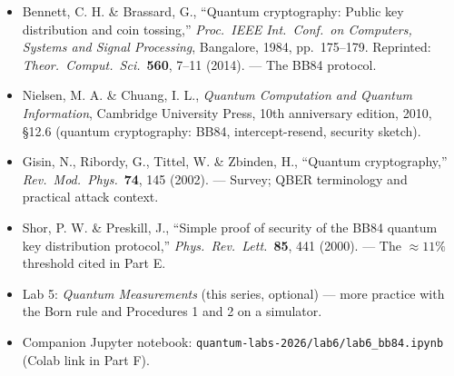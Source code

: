 \documentclass[a4paper,11pt]{article}
\begin{document}
\begin{itemize}
    \item Bennett, C. H. \& Brassard, G., ``Quantum cryptography: Public key
          distribution and coin tossing,'' \textit{Proc.\ IEEE Int.\ Conf.\ on
          Computers, Systems and Signal Processing}, Bangalore, 1984, pp.~175--179.
          Reprinted: \textit{Theor.\ Comput.\ Sci.}\ \textbf{560}, 7--11 (2014).
          --- The BB84 protocol.
    \item Nielsen, M. A. \& Chuang, I. L., \textit{Quantum Computation and Quantum
          Information}, Cambridge University Press, 10th anniversary edition, 2010,
          \S 12.6 (quantum cryptography: BB84, intercept-resend, security sketch).
    \item Gisin, N., Ribordy, G., Tittel, W. \& Zbinden, H., ``Quantum
          cryptography,'' \textit{Rev.\ Mod.\ Phys.}\ \textbf{74}, 145 (2002). ---
          Survey; QBER terminology and practical attack context.
    \item Shor, P. W. \& Preskill, J., ``Simple proof of security of the BB84
          quantum key distribution protocol,'' \textit{Phys.\ Rev.\ Lett.}\
          \textbf{85}, 441 (2000). --- The $\approx 11\%$ threshold cited in Part E.
    \item Lab 5: \textit{Quantum Measurements} (this series, optional) --- more
          practice with the Born rule and Procedures 1 and 2 on a simulator.
    \item Companion Jupyter notebook:
          \texttt{quantum-labs-2026/lab6/lab6\_bb84.ipynb} (Colab link in Part F).
\end{itemize}
\end{document}
